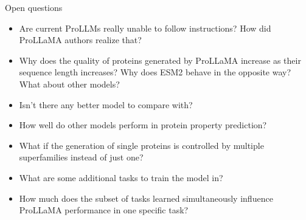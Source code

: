 \begin{frame}{Open questions}
	\begin{itemize}\setlength\itemsep{0.75em}
		\item Are current ProLLMs really unable to follow instructions? How did ProLLaMA authors realize that?
		\item Why does the quality of proteins generated by ProLLaMA increase as their sequence length increases? Why does ESM2 behave in the opposite way? What about other models?
		\item Isn't there any better model to compare with?
		\item How well do other models perform in protein property prediction?
		\item What if the generation of single proteins is controlled by multiple superfamilies instead of just one?
		\item What are some additional tasks to train the model in?
		\item How much does the subset of tasks learned simultaneously influence ProLLaMA performance in one specific task?
	\end{itemize}
\end{frame}